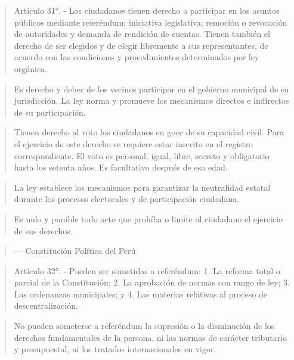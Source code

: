 \documentclass[
]{book}
\begin{document}
\begin{quote}
Artículo 31°. - Los ciudadanos tienen derecho a participar en los asuntos públicos
mediante referéndum; iniciativa legislativa; remoción o revocación de autoridades
y demanda de rendición de cuentas. Tienen también el derecho de ser elegidos y
de elegir libremente a sus representantes, de acuerdo con las condiciones y
procedimientos determinados por ley orgánica.
\end{quote}

\begin{quote}
Es derecho y deber de los vecinos participar en el gobierno municipal de su
jurisdicción. La ley norma y promueve los mecanismos directos e indirectos de su
participación.
\end{quote}

\begin{quote}
Tienen derecho al voto los ciudadanos en goce de su capacidad civil. Para el
ejercicio de este derecho se requiere estar inscrito en el registro correspondiente.
El voto es personal, igual, libre, secreto y obligatorio hasta los setenta años. Es
facultativo después de esa edad.
\end{quote}

\begin{quote}
La ley establece los mecanismos para garantizar la neutralidad estatal durante los
procesos electorales y de participación ciudadana.
\end{quote}

\begin{quote}
Es nulo y punible todo acto que prohíba o limite al ciudadano el ejercicio de sus
derechos.
\end{quote}

\begin{quote}
--- Constitución Política del Perú
\end{quote}

\begin{quote}
Artículo 32°. - Pueden ser sometidas a referéndum:
1. La reforma total o parcial de la Constitución;
2. La aprobación de normas con rango de ley;
3. Las ordenanzas municipales; y
4. Las materias relativas al proceso de descentralización.
\end{quote}

\begin{quote}
No pueden someterse a referéndum la supresión o la disminución de los derechos
fundamentales de la persona, ni las normas de carácter tributario y presupuestal,
ni los tratados internacionales en vigor.
\end{quote}
\end{document}
